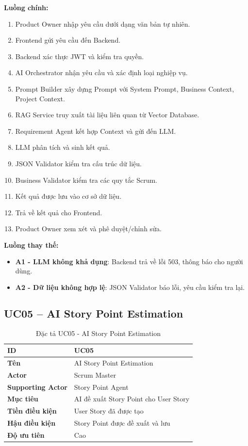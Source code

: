 \documentclass[12pt,a4paper]{report}
\begin{document}
\textbf{Luồng chính:}

\begin{enumerate}
\item Product Owner nhập yêu cầu dưới dạng văn bản tự nhiên.
\item Frontend gửi yêu cầu đến Backend.
\item Backend xác thực JWT và kiểm tra quyền.
\item AI Orchestrator nhận yêu cầu và xác định loại nghiệp vụ.
\item Prompt Builder xây dựng Prompt với System Prompt, Business Context, Project Context.
\item RAG Service truy xuất tài liệu liên quan từ Vector Database.
\item Requirement Agent kết hợp Context và gửi đến LLM.
\item LLM phân tích và sinh kết quả.
\item JSON Validator kiểm tra cấu trúc dữ liệu.
\item Business Validator kiểm tra các quy tắc Scrum.
\item Kết quả được lưu vào cơ sở dữ liệu.
\item Trả về kết quả cho Frontend.
\item Product Owner xem xét và phê duyệt/chỉnh sửa.
\end{enumerate}

\textbf{Luồng thay thế:}

\begin{itemize}
\item \textbf{A1 - LLM không khả dụng}: Backend trả về lỗi 503, thông báo cho người dùng.
\item \textbf{A2 - Dữ liệu không hợp lệ}: JSON Validator báo lỗi, yêu cầu kiểm tra lại.
\end{itemize}

\subsection{UC05 -- AI Story Point Estimation}

\begin{table}[H]
\centering
\caption{Đặc tả UC05 - AI Story Point Estimation}
\begin{tabular}{|p{4cm}|p{11cm}|}
\hline
\textbf{ID} & UC05 \\
\hline
\textbf{Tên} & AI Story Point Estimation \\
\hline
\textbf{Actor} & Scrum Master \\
\hline
\textbf{Supporting Actor} & Story Point Agent \\
\hline
\textbf{Mục tiêu} & AI đề xuất Story Point cho User Story \\
\hline
\textbf{Tiền điều kiện} & User Story đã được tạo \\
\hline
\textbf{Hậu điều kiện} & Story Point được đề xuất và lưu \\
\hline
\textbf{Độ ưu tiên} & Cao \\
\hline
\end{tabular}
\end{table}
\end{document}
